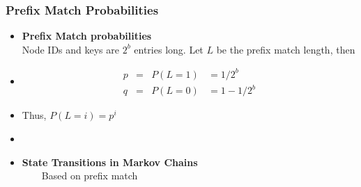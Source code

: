 \documentclass[xcolor=pdftex,dvipsnames,table]{beamer}
\begin{document}
\begin{frame}
\frametitle{Prefix Match Probabilities} \vspace{-0.15in}
   \begin{itemize}
     \item \textbf{Prefix Match probabilities} \\Node IDs and keys are  $2^b$
     entries long.  Let $L$ be the prefix match length, then
       \vspace{-0.2in}
     \item[]\begin{eqnarray}
                \nonumber p  &=&  P(L = 1) ~~~~ = 1/2^b \\
                \nonumber q  &=&  P(L=0) ~~~~ = 1- 1/2^b
             \end{eqnarray}
     \item[] Thus,   $P(L = i) = p^i$
    \item []
    \item \textbf{State Transitions in Markov Chains}\\
            ~~~~Based on prefix match
   \end{itemize}
\end{frame}
\end{document}
